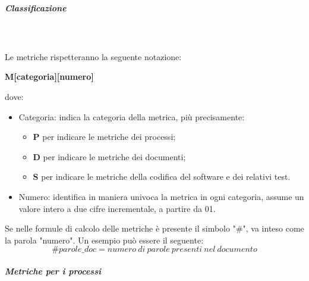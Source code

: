 \subparagraph{Classificazione}\mbox{} \\ \mbox{} \\
Le metriche rispetteranno la seguente notazione: \\
\centerline{\textbf{M[categoria][numero]}}
dove: \begin{itemize}
\item Categoria: indica la categoria della metrica, più precisamente:
\begin{itemize}
\item \textbf{P} per indicare le metriche dei processi;
\item \textbf{D} per indicare le metriche dei documenti;
\item \textbf{S} per indicare le metriche della codifica del software e dei relativi test.
\end{itemize}
\item Numero: identifica in maniera univoca la metrica in ogni categoria, assume un valore intero a due cifre incrementale, a partire da 01.
\end{itemize}
Se nelle formule di calcolo delle metriche è presente il simbolo "\#", va inteso come la parola "numero". Un esempio può essere il seguente:
\[ \#parole\_doc = numero\ di\ parole\ presenti\ nel\ documento \]
\subparagraph{Metriche per i processi}  \mbox{} \\ 
